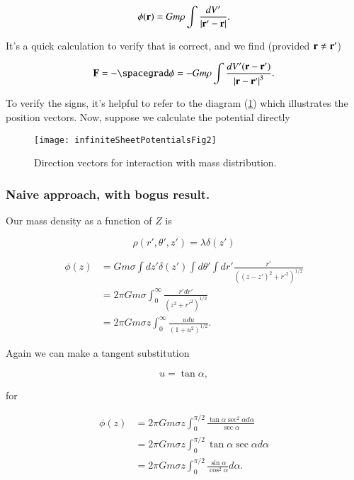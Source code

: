 \begin{equation}\label{eqn:infiniteSheetPotentials:110}
\phi(\mathbf{r}) = G m \rho \int \frac{dV'}{\left\lvert{\mathbf{r}' - \mathbf{r}}\right\rvert}.
\end{equation}

It's a quick calculation to verify that is correct, and we find (provided $\mathbf{r} \ne \mathbf{r}'$)

\begin{equation}\label{eqn:infiniteSheetPotentials:130}
\BF = - \spacegrad \phi = - G m \rho \int \frac{dV' (\Br - \Br')}{\Abs{\Br - \Br'}^3}.
\end{equation}

To verify the signs, it's helpful to refer to the diagram (\ref{fig:infiniteSheetPotentials:infiniteSheetPotentialsFig2}) which illustrates the position vectors.  Now, suppose we calculate the potential directly
\begin{figure}[htp]
   \centering
   \texttt{[image: infiniteSheetPotentialsFig2]}
   \caption{Direction vectors for interaction with mass distribution.}\label{fig:infiniteSheetPotentials:infiniteSheetPotentialsFig2}
\end{figure}

\subsubsection{Naive approach, with bogus result.}
Our mass density as a function of $Z$ is

\begin{equation}\label{eqn:infiniteSheetPotentials:170}
\rho(r', \theta', z') = \lambda \delta(z')
\end{equation}

\begin{align*}
\phi(z)
&= G m \sigma \int dz' \delta(z') \int d\theta' \int dr' \frac{r' }{((z-z')^2 + {r'}^2)^{1/2}} \\
&= 2 \pi G m \sigma \int_0^\infty \frac{r' dr' }{(z^2 + {r'}^2)^{1/2}} \\
&= 2 \pi G m \sigma z \int_0^\infty \frac{u du }{(1 + u^2)^{1/2}}.
\end{align*}

Again we can make a tangent substitution

\begin{equation}\label{eqn:infiniteSheetPotentials:150}
u = \tan\alpha,
\end{equation}

for

\begin{align*}
\phi(z)
&= 2 \pi G m \sigma z \int_0^{\pi/2} \frac{\tan \alpha \sec^2 \alpha d \alpha }{\sec\alpha} \\
&= 2 \pi G m \sigma z \int_0^{\pi/2} \tan \alpha \sec \alpha d \alpha \\
&= 2 \pi G m \sigma z \int_0^{\pi/2} \frac{\sin \alpha}{\cos^2 \alpha} d \alpha.
\end{align*}


